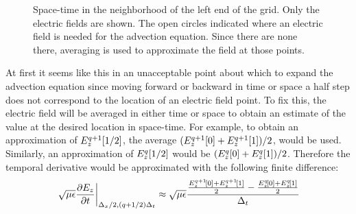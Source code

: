 \begin{figure}
  \begin{center}
  \end{center}
  \caption{Space-time in the neighborhood of the left end of the grid.
  Only the electric fields are shown.  The open circles indicated
  where an electric field is needed for the advection equation.  Since
  there are none there, averaging is used to approximate the field at
  those points.}  \label{fig:advectionABC}
\end{figure}

At first it seems like this in an unacceptable point about which to
expand the advection equation since moving forward or backward in time
or space a half step does not correspond to the location of an
electric field point.  To fix this, the electric field will be averaged
in either time or space to obtain an estimate of the value at the
desired location in space-time.  For example, to obtain an
approximation of $\fdtd{E_z}{1/2}{q+1}$, the average
$(\fdtd{E_z}{0}{q+1}+\fdtd{E_z}{1}{q+1})/2$, would be used.
Similarly, an approximation of $\fdtd{E_z}{1/2}{q}$ would be
$(\fdtd{E_z}{0}{q}+\fdtd{E_z}{1}{q})/2$.  Therefore the temporal
derivative would be approximated with the following finite difference:
\begin{equation}
  \left. \sqrt{\mu\epsilon}
    \frac{\partial E_z}{\partial t}\right|_{\Delx/2,(q+1/2)\Delt}
  \approx
    \sqrt{\mu\epsilon}
    \frac{
     \frac{\fdtd{E_z}{0}{q+1}+\fdtd{E_z}{1}{q+1}}{2} -
     \frac{\fdtd{E_z}{0}{q}+\fdtd{E_z}{1}{q}}{2}
    }{\Delt}
   \label{eq:tDiffSpaceAvg}
\end{equation}

